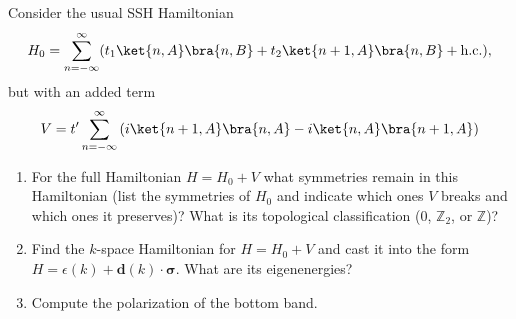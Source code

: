 \documentclass{jhwhw}
\begin{document}

Consider the usual SSH Hamiltonian
\begin{equation}
  \label{eq:7}
  H_{0} = \sum_{n=-\infty}^{\infty} (t_{1} \ket{n,A}\bra{n,B} + t_{2}\ket{n+1,A}\bra{n,B} + \mathrm{h.c.}),
\end{equation}
but with an added term
\begin{equation}
  \label{eq:8}
  V = t' \sum_{n=-\infty}^{\infty} \left(i\ket{n+1,A}\bra{n,A} - i \ket{n,A}\bra{n+1,A}\right)
\end{equation}

\begin{enumerate}
  \item For the full Hamiltonian $H = H_{0} + V$ what symmetries remain in this Hamiltonian (list the symmetries of $H_{0}$ and indicate which ones $V$ breaks and which ones it preserves)? What is its topological classification ($0$, $\mathbb Z_{2}$, or $\mathbb Z$)?
  \item Find the $k$-space Hamiltonian for $H = H_{0} + V$ and cast it into the form $H = \epsilon(k) + \mathbf d(k) \cdot \bm \sigma$. What are its eigenenergies?
  \item Compute the polarization of the bottom band.
\end{enumerate}


\end{document}
